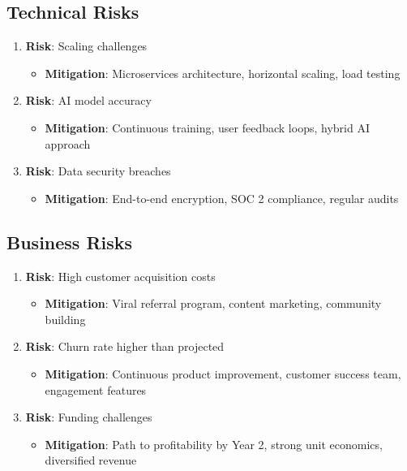 \subsection{Technical Risks}

\begin{enumerate}
    \item \textbf{Risk}: Scaling challenges
    \begin{itemize}
        \item \textbf{Mitigation}: Microservices architecture, horizontal scaling, load testing
    \end{itemize}
    
    \item \textbf{Risk}: AI model accuracy
    \begin{itemize}
        \item \textbf{Mitigation}: Continuous training, user feedback loops, hybrid AI approach
    \end{itemize}
    
    \item \textbf{Risk}: Data security breaches
    \begin{itemize}
        \item \textbf{Mitigation}: End-to-end encryption, SOC 2 compliance, regular audits
    \end{itemize}
\end{enumerate}

\subsection{Business Risks}

\begin{enumerate}
    \item \textbf{Risk}: High customer acquisition costs
    \begin{itemize}
        \item \textbf{Mitigation}: Viral referral program, content marketing, community building
    \end{itemize}
    
    \item \textbf{Risk}: Churn rate higher than projected
    \begin{itemize}
        \item \textbf{Mitigation}: Continuous product improvement, customer success team, engagement features
    \end{itemize}
    
    \item \textbf{Risk}: Funding challenges
    \begin{itemize}
        \item \textbf{Mitigation}: Path to profitability by Year 2, strong unit economics, diversified revenue
    \end{itemize}
\end{enumerate}

